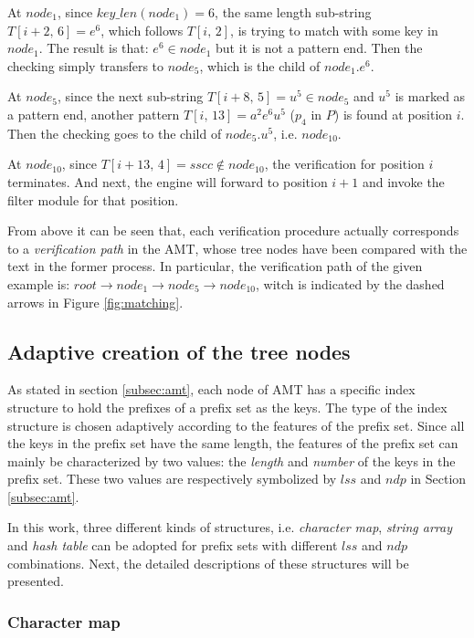 \documentclass{article}
\begin{document}
At $node_1$, since $key\_len(node_1)=6$, the same length sub-string
$T[i+2,\,6]=e^6$, which follows $T[i,\,2]$, is trying to match with
some key in $node_1$. The result is that: $e^6 \in node_1$ but it is
not a pattern end. Then the checking simply transfers to $node_5$,
which is the child of $node_1.e^6$.

At $node_5$, since the next sub-string $T[i+8,\,5]=u^5 \in node_5$ and
$u^5$ is marked as a pattern end, another pattern
$T[i,\,13]=a^2e^6u^5$ ($p_4$ in $P$) is found at position $i$. Then
the checking goes to the child of $node_5.u^5$, i.e.  $node_{10}$.

At $node_{10}$, since $T[i+13,\,4]=sscc \notin node_{10}$, the
verification for position $i$ terminates. And next, the engine will
forward to position $i+1$ and invoke the filter module for that
position.

From above it can be seen that, each verification procedure actually
corresponds to a \emph{verification path} in the AMT, whose tree nodes
have been compared with the text in the former process. In particular,
the verification path of the given example is:
$root \rightarrow node_1 \rightarrow node_5 \rightarrow node_{10}$,
witch is indicated by the dashed arrows in Figure \ref{fig:matching}.


\subsection{Adaptive creation of the tree nodes}
\label{subsec:nodes}

As stated in section \ref{subsec:amt}, each node of AMT has a specific
index structure to hold the prefixes of a prefix set as the keys. The
type of the index structure is chosen adaptively according to the
features of the prefix set. Since all the keys in the prefix set have
the same length, the features of the prefix set can mainly be
characterized by two values: the \emph{length} and \emph{number} of
the keys in the prefix set. These two values are respectively
symbolized by $lss$ and $ndp$ in Section \ref{subsec:amt}.

In this work, three different kinds of structures,
i.e. \emph{character map}, \emph{string array} and \emph{hash table}
can be adopted for prefix sets with different $lss$ and $ndp$
combinations. Next, the detailed descriptions of these structures will
be presented.

\subsubsection{Character map}
\end{document}
